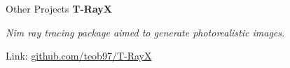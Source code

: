 \begin{rubric}{Other Projects}
\entry*[]%
    \textbf{T-RayX}
    \par \textit{Nim ray tracing package aimed to generate photorealistic images.}
    \par Link: \href{https://github.com/teob97/T-RayX}{github.com/teob97/T-RayX} 
\end{rubric}
